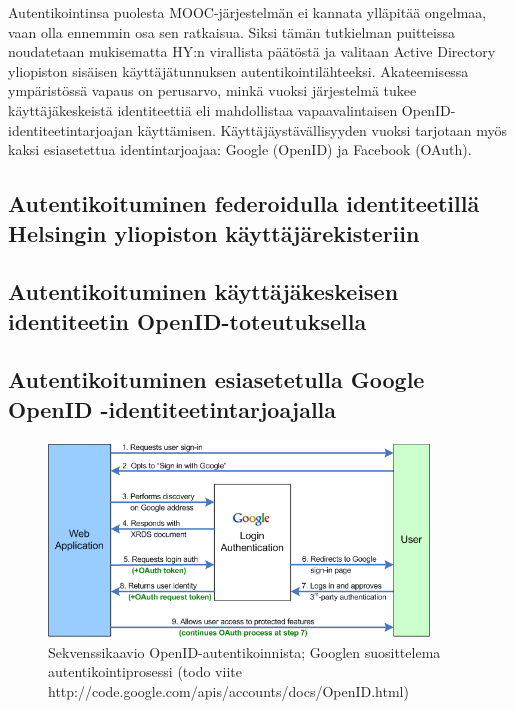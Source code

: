 \documentclass[finnish,gradu]{tktltiki}
\begin{document}
  Autentikointinsa puolesta MOOC-järjestelmän ei kannata ylläpitää ongelmaa, vaan olla ennemmin osa sen ratkaisua. Siksi tämän tutkielman puitteissa noudatetaan mukisematta HY:n virallista päätöstä ja valitaan Active Directory yliopiston sisäisen käyttäjätunnuksen autentikointilähteeksi. Akateemisessa ympäristössä vapaus on perusarvo, minkä vuoksi järjestelmä tukee käyttäjäkeskeistä identiteettiä eli mahdollistaa vapaavalintaisen OpenID-identiteetintarjoajan käyttämisen. Käyttäjäystävällisyyden vuoksi tarjotaan myös kaksi esiasetettua identintarjoajaa: Google (OpenID) ja Facebook (OAuth).



  \subsection{Autentikoituminen federoidulla identiteetillä Helsingin yliopiston käyttäjärekisteriin} %
  \label{sub:autentikoituminen_helsingin_yliopiston_käyttäjärekisteriin}


  \subsection{Autentikoituminen käyttäjäkeskeisen identiteetin OpenID-toteutuksella} %
  \label{sub:autentikoituminen_käyttäjäkeskeisellä_identiteetillä}


  \subsection{Autentikoituminen esiasetetulla Google OpenID -identiteetintarjoajalla} %
  \label{sub:autentikoituminen_esiasetetulla_openid_identiteetintarjoajalla}

  \begin{figure}
    \centering
    \includegraphics[width=0.9\textwidth]{images/google_openid_diagram.png}
    \caption{Sekvenssikaavio OpenID-autentikoinnista; Googlen suosittelema autentikointiprosessi (todo viite http://code.google.com/apis/accounts/docs/OpenID.html)}
    \label{fig:sekvenssikaavio_google_openid}
  \end{figure}
\end{document}
